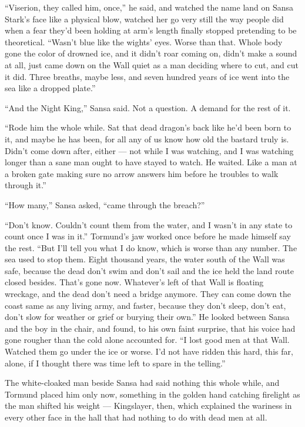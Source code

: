 “Viserion, they called him, once,” he said, and watched the name land on Sansa Stark’s face like a physical blow, watched her go very still the way people did when a fear they’d been holding at arm’s length finally stopped pretending to be theoretical. “Wasn’t blue like the wights’ eyes. Worse than that. Whole body gone the color of drowned ice, and it didn’t roar coming on, didn’t make a sound at all, just came down on the Wall quiet as a man deciding where to cut, and cut it did. Three breaths, maybe less, and seven hundred years of ice went into the sea like a dropped plate.”

“And the Night King,” Sansa said. Not a question. A demand for the rest of it.

“Rode him the whole while. Sat that dead dragon’s back like he’d been born to it, and maybe he has been, for all any of us know how old the bastard truly is. Didn’t come down after, either — not while I was watching, and I was watching longer than a sane man ought to have stayed to watch. He waited. Like a man at a broken gate making sure no arrow answers him before he troubles to walk through it.”

“How many,” Sansa asked, “came through the breach?”

“Don’t know. Couldn’t count them from the water, and I wasn’t in any state to count once I was in it.” Tormund’s jaw worked once before he made himself say the rest. “But I’ll tell you what I do know, which is worse than any number. The sea used to stop them. Eight thousand years, the water south of the Wall was safe, because the dead don’t swim and don’t sail and the ice held the land route closed besides. That’s gone now. Whatever’s left of that Wall is floating wreckage, and the dead don’t need a bridge anymore. They can come down the coast same as any living army, and faster, because they don’t sleep, don’t eat, don’t slow for weather or grief or burying their own.” He looked between Sansa and the boy in the chair, and found, to his own faint surprise, that his voice had gone rougher than the cold alone accounted for. “I lost good men at that Wall. Watched them go under the ice or worse. I’d not have ridden this hard, this far, alone, if I thought there was time left to spare in the telling.”

The white-cloaked man beside Sansa had said nothing this whole while, and Tormund placed him only now, something in the golden hand catching firelight as the man shifted his weight — Kingslayer, then, which explained the wariness in every other face in the hall that had nothing to do with dead men at all.

